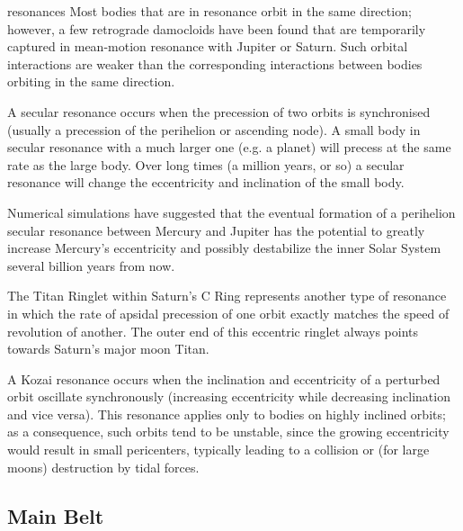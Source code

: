 \begin{wordonframe}{resonances}
Most bodies that are in resonance orbit in the same direction; however, a few retrograde damocloids have been found that are temporarily captured in mean-motion resonance with Jupiter or Saturn. Such orbital interactions are weaker than the corresponding interactions between bodies orbiting in the same direction.

A secular resonance occurs when the precession of two orbits is synchronised (usually a precession of the perihelion or ascending node). A small body in secular resonance with a much larger one (e.g. a planet) will precess at the same rate as the large body. Over long times (a million years, or so) a secular resonance will change the eccentricity and inclination of the small body.

Numerical simulations have suggested that the eventual formation of a perihelion secular resonance between Mercury and Jupiter has the potential to greatly increase Mercury's eccentricity and possibly destabilize the inner Solar System several billion years from now.

The Titan Ringlet within Saturn's C Ring represents another type of resonance in which the rate of apsidal precession of one orbit exactly matches the speed of revolution of another. The outer end of this eccentric ringlet always points towards Saturn's major moon Titan.

A Kozai resonance occurs when the inclination and eccentricity of a perturbed orbit oscillate synchronously (increasing eccentricity while decreasing inclination and vice versa). This resonance applies only to bodies on highly inclined orbits; as a consequence, such orbits tend to be unstable, since the growing eccentricity would result in small pericenters, typically leading to a collision or (for large moons) destruction by tidal forces.
\end{wordonframe}

\subsection{Main Belt}

